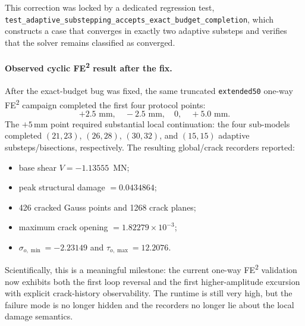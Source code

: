This correction was locked by a dedicated regression test,
\texttt{test\_adaptive\_substepping\_accepts\_exact\_budget\_completion},
which constructs a case that converges in exactly two adaptive substeps and
verifies that the solver remains classified as converged.

\paragraph{Observed cyclic FE\textsuperscript{2} result after the fix.}
After the exact-budget bug was fixed, the same truncated
\texttt{extended50} one-way FE\textsuperscript{2} campaign completed the first
four protocol points:
\[
  +2.5\text{ mm},\quad -2.5\text{ mm},\quad 0,\quad +5.0\text{ mm}.
\]
The \(+5\)\,mm point required substantial local continuation:
the four sub-models completed \((21,23)\), \((26,28)\), \((30,32)\), and
\((15,15)\) adaptive substeps/bisections, respectively.  The resulting
global/crack recorders reported:
\begin{itemize}
  \item base shear \(V = -1.13555\)~MN;
  \item peak structural damage \(= 0.0434864\);
  \item 426 cracked Gauss points and 1268 crack planes;
  \item maximum crack opening \(= 1.82279\times 10^{-3}\);
  \item \(\sigma_{o,\min} = -2.23149\) and
    \(\tau_{o,\max} = 12.2076\).
\end{itemize}

Scientifically, this is a meaningful milestone: the current one-way
FE\textsuperscript{2} validation now exhibits both the first loop reversal and
the first higher-amplitude excursion with explicit crack-history observability.
The runtime is still very high, but the failure mode is no longer hidden and
the recorders no longer lie about the local damage semantics.


